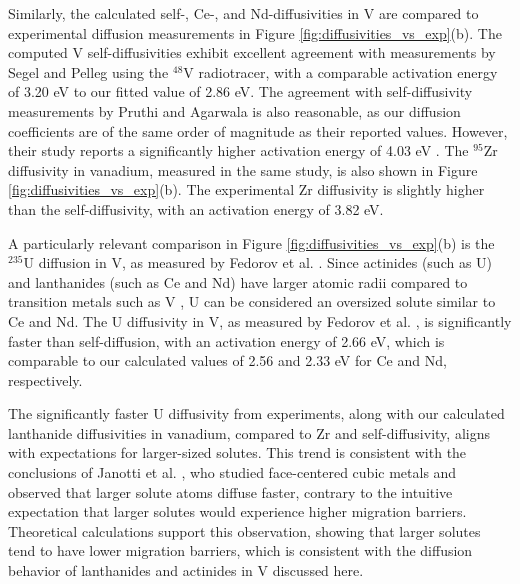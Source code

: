 \documentclass[preprint,12pt]{elsarticle}
\begin{document}
Similarly, the calculated self-, Ce-, and Nd-diffusivities in V are compared to experimental diffusion measurements \cite{segel1997vanadium, pruthi1984solute, fedorov1971diffusion} in Figure
\ref{fig:diffusivities_vs_exp}(b). The computed V self-diffusivities exhibit excellent agreement with measurements by Segel and Pelleg \cite{segel1997vanadium} using the $^{48}$V radiotracer, with a comparable activation energy of 3.20 eV to our fitted value of 2.86 eV. The agreement with self-diffusivity measurements by Pruthi and Agarwala \cite{pruthi1984solute} is also reasonable, as our diffusion coefficients are of the same order of magnitude as their reported values. However, their study reports a significantly higher activation energy of 4.03 eV \cite{pruthi1984solute}. The $^{95}$Zr diffusivity in vanadium, measured in the same study, is also shown in Figure
\ref{fig:diffusivities_vs_exp}(b). The experimental Zr diffusivity is slightly higher than the self-diffusivity, with an activation energy of 3.82 eV.

A particularly relevant comparison in Figure
\ref{fig:diffusivities_vs_exp}(b) is the $^{235}$U diffusion in V, as measured by Fedorov et al. \cite{fedorov1971diffusion}. Since actinides (such as U) and lanthanides (such as Ce and Nd) have larger atomic radii compared to transition metals such as V \cite{rahm2016atomic}, U can be considered an oversized solute similar to Ce and Nd. The U diffusivity in V, as measured by Fedorov et al. \cite{fedorov1971diffusion}, is significantly faster than self-diffusion, with an activation energy of 2.66 eV, which is comparable to our calculated values of 2.56 and 2.33 eV for Ce and Nd, respectively.

The significantly faster U diffusivity from experiments, along with our calculated lanthanide diffusivities in vanadium, compared to Zr and self-diffusivity, aligns with expectations for larger-sized solutes. This trend is consistent with the conclusions of Janotti et al. \cite{janotti2004solute}, who studied face-centered cubic metals and observed that larger solute atoms diffuse faster, contrary to the intuitive expectation that larger solutes would experience higher migration barriers. Theoretical calculations \cite{DENG201655,janotti2004solute} support this observation, showing that larger solutes tend to have lower migration barriers, which is consistent with the diffusion behavior of lanthanides and actinides in V discussed here.

\end{document}
